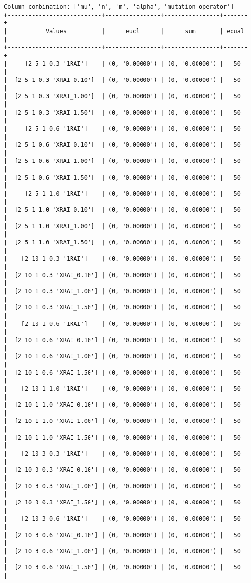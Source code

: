 \documentclass{article}
\begin{document}
\begin{verbatim}
Column combination: ['mu', 'n', 'm', 'alpha', 'mutation_operator']
+---------------------------+----------------+----------------+-------+
|           Values          |      eucl      |      sum       | equal |
+---------------------------+----------------+----------------+-------+
|     [2 5 1 0.3 '1RAI']    | (0, '0.00000') | (0, '0.00000') |   50  |
|  [2 5 1 0.3 'XRAI_0.10']  | (0, '0.00000') | (0, '0.00000') |   50  |
|  [2 5 1 0.3 'XRAI_1.00']  | (0, '0.00000') | (0, '0.00000') |   50  |
|  [2 5 1 0.3 'XRAI_1.50']  | (0, '0.00000') | (0, '0.00000') |   50  |
|     [2 5 1 0.6 '1RAI']    | (0, '0.00000') | (0, '0.00000') |   50  |
|  [2 5 1 0.6 'XRAI_0.10']  | (0, '0.00000') | (0, '0.00000') |   50  |
|  [2 5 1 0.6 'XRAI_1.00']  | (0, '0.00000') | (0, '0.00000') |   50  |
|  [2 5 1 0.6 'XRAI_1.50']  | (0, '0.00000') | (0, '0.00000') |   50  |
|     [2 5 1 1.0 '1RAI']    | (0, '0.00000') | (0, '0.00000') |   50  |
|  [2 5 1 1.0 'XRAI_0.10']  | (0, '0.00000') | (0, '0.00000') |   50  |
|  [2 5 1 1.0 'XRAI_1.00']  | (0, '0.00000') | (0, '0.00000') |   50  |
|  [2 5 1 1.0 'XRAI_1.50']  | (0, '0.00000') | (0, '0.00000') |   50  |
|    [2 10 1 0.3 '1RAI']    | (0, '0.00000') | (0, '0.00000') |   50  |
|  [2 10 1 0.3 'XRAI_0.10'] | (0, '0.00000') | (0, '0.00000') |   50  |
|  [2 10 1 0.3 'XRAI_1.00'] | (0, '0.00000') | (0, '0.00000') |   50  |
|  [2 10 1 0.3 'XRAI_1.50'] | (0, '0.00000') | (0, '0.00000') |   50  |
|    [2 10 1 0.6 '1RAI']    | (0, '0.00000') | (0, '0.00000') |   50  |
|  [2 10 1 0.6 'XRAI_0.10'] | (0, '0.00000') | (0, '0.00000') |   50  |
|  [2 10 1 0.6 'XRAI_1.00'] | (0, '0.00000') | (0, '0.00000') |   50  |
|  [2 10 1 0.6 'XRAI_1.50'] | (0, '0.00000') | (0, '0.00000') |   50  |
|    [2 10 1 1.0 '1RAI']    | (0, '0.00000') | (0, '0.00000') |   50  |
|  [2 10 1 1.0 'XRAI_0.10'] | (0, '0.00000') | (0, '0.00000') |   50  |
|  [2 10 1 1.0 'XRAI_1.00'] | (0, '0.00000') | (0, '0.00000') |   50  |
|  [2 10 1 1.0 'XRAI_1.50'] | (0, '0.00000') | (0, '0.00000') |   50  |
|    [2 10 3 0.3 '1RAI']    | (0, '0.00000') | (0, '0.00000') |   50  |
|  [2 10 3 0.3 'XRAI_0.10'] | (0, '0.00000') | (0, '0.00000') |   50  |
|  [2 10 3 0.3 'XRAI_1.00'] | (0, '0.00000') | (0, '0.00000') |   50  |
|  [2 10 3 0.3 'XRAI_1.50'] | (0, '0.00000') | (0, '0.00000') |   50  |
|    [2 10 3 0.6 '1RAI']    | (0, '0.00000') | (0, '0.00000') |   50  |
|  [2 10 3 0.6 'XRAI_0.10'] | (0, '0.00000') | (0, '0.00000') |   50  |
|  [2 10 3 0.6 'XRAI_1.00'] | (0, '0.00000') | (0, '0.00000') |   50  |
|  [2 10 3 0.6 'XRAI_1.50'] | (0, '0.00000') | (0, '0.00000') |   50  |

\end{verbatim}
\end{document}

